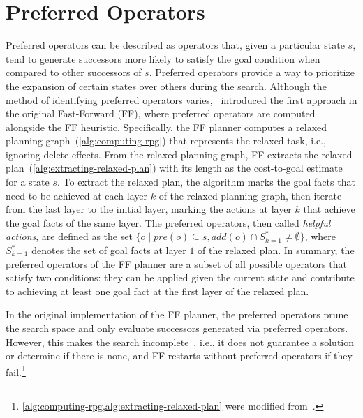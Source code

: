 \documentclass[ppgc,diss,english]{iiufrgs}
\begin{document}
\section{Preferred Operators}
\label{sec:background-preferred-operators}

Preferred operators can be described as operators that, given a particular state $s$, tend to generate successors more likely to satisfy the goal condition when compared to other successors of $s$. Preferred operators provide a way to prioritize the expansion of certain states over others during the search. Although the method of identifying preferred operators varies,~\citet{Hoffmann.Nebel/2001} introduced the first approach in the original Fast-Forward (FF), where preferred operators are computed alongside the FF heuristic.
Specifically, the FF planner computes a relaxed planning graph~(\cref{alg:computing-rpg}) that represents the relaxed task, i.e., ignoring delete-effects. From the relaxed planning graph, FF extracts the relaxed plan~(\cref{alg:extracting-relaxed-plan}) with its length as the cost-to-goal estimate for a state $s$. To extract the relaxed plan, the algorithm marks the goal facts that need to be achieved at each layer $k$ of the relaxed planning graph, then iterate from the last layer to the initial layer, marking the actions at layer $k$ that achieve the goal facts of the same layer. The preferred operators, then called \emph{helpful actions}, are defined as the set $\{o \mid pre(o) \subseteq s, add(o) \cap S_{k=1}^{*} \neq \emptyset \}$, where $S_{k=1}^{*}$ denotes the set of goal facts at layer $1$ of the relaxed plan. In summary, the preferred operators of the FF planner are a subset of all possible operators that satisfy two conditions: they can be applied given the current state and contribute to achieving at least one goal fact at the first layer of the relaxed plan.

In the original implementation of the FF planner, the preferred operators prune the search space and only evaluate successors generated via preferred operators. However, this makes the search incomplete~\cite{Richter.Helmert/2009}, i.e., it does not guarantee a solution or determine if there is none, and FF restarts without preferred operators if they fail.\footnote{\cref{alg:computing-rpg,alg:extracting-relaxed-plan} were modified from~\citet{Wickler.etal/2015}.}
\end{document}
